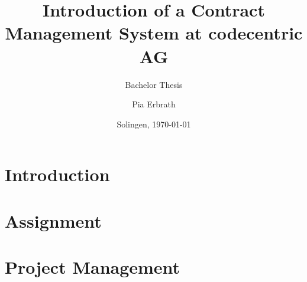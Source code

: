 
\usepackage{sebithesistitle}
\usepackage{rotate}
\usepackage[toc,page]{appendix}
\usepackage{eurosym}
\usepackage{color, colortbl}

\title{Introduction of a Contract Management System \newline at codecentric AG}
\subtitle{Bachelor Thesis}
\author{Pia Erbrath}
\def\place{Solingen}
\date{\place, \today}

\def\documentname{Interim Report for Bachelor Thesis}
\def\studentname{Pia Erbrath}
\def\snumber{2300869}
\def\course{Informatics - Software Engineering}
\def\period{February 2018 - July 2018}
\def\companyname{codecentric AG}
\def\companyaddress{Hochstr. 11}
\def\companypostcodecity{42697, Solingen}
\def\companycountry{Germany}
\def\companycoach{Niko Bl\"attermann}
\def\companycoachmail{niko.blaettermann@codecentric.de}
\def\universitytutor{Ferd van Odenhoven}
\def\universitytutormail{f.vanodenhoven@fontys.nl}
\def\examinator{Marco Langenhuizen}
\def\externalexpert{Professional B}
\def\hasnda{no}



\makeglossaries


	\maketitle
	\pagestyle{plain}
	
	\newpage
	
	\newpage
	
	\tableofcontents
	\listoftables
	\listoffigures
	\newpage
	
	\newpage
	\pagestyle{ownstyle}
	\chapter{Introduction}
	
	
	\chapter{Assignment}
	
	
	\chapter{Project Management}
	
	
